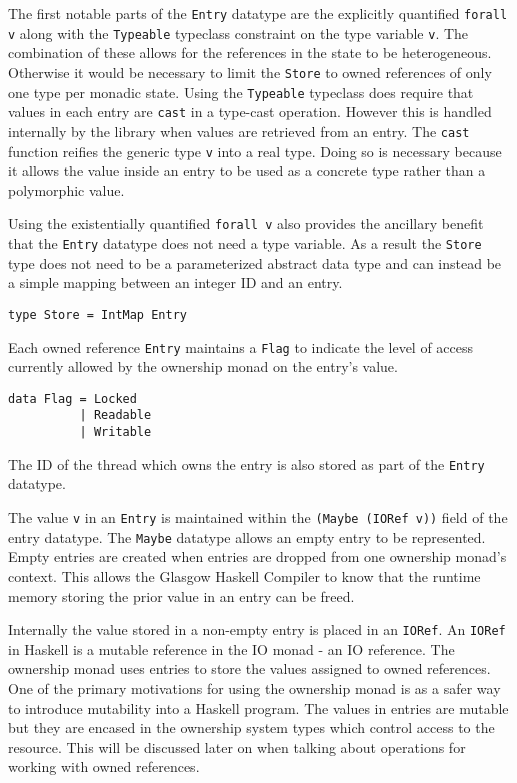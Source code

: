 \documentclass[onehalf,11pt]{beavtex}
\begin{document}
The first notable parts of the \texttt{Entry} datatype are the explicitly
quantified \texttt{forall v} along with the \texttt{Typeable} typeclass
constraint on the type variable \texttt{v}.
The combination of these allows for the references in the state to be
heterogeneous.
Otherwise it would be necessary to limit the \texttt{Store} to owned
references of only one type per monadic state.
Using the \texttt{Typeable} typeclass does require that values in each entry are
\texttt{cast} in a type-cast operation.  However this is handled internally
by the library when values are retrieved from an entry.
The \texttt{cast} function reifies the generic type \texttt{v} into a real
type.
Doing so is necessary because it allows the value inside an entry to be used
as a concrete type rather than a polymorphic value.

Using the existentially quantified \texttt{forall v} also provides the
ancillary benefit that the \texttt{Entry} datatype does not need a type
variable.
As a result the \texttt{Store} type does not need to be a parameterized abstract
data type and can instead be a simple mapping between an integer ID and an entry.

\begin{verbatim}
type Store = IntMap Entry
\end{verbatim}

Each owned reference \texttt{Entry} maintains a \texttt{Flag} to indicate the
level of access currently allowed by the ownership monad on the entry's value.

\begin{verbatim}
data Flag = Locked
          | Readable
          | Writable
\end{verbatim}

The ID of the thread which owns the entry is also stored as part of the
\texttt{Entry} datatype. 

The value \texttt{v} in an \texttt{Entry} is maintained within the
\texttt{(Maybe (IORef v))} field of the entry datatype.
The \texttt{Maybe} datatype allows an empty entry to be represented.
Empty entries are created when entries are dropped from one ownership monad's
context.  This allows the Glasgow Haskell Compiler to know that
the runtime memory storing the prior value in an entry can be freed.

Internally the value stored in a non-empty entry is placed in an \texttt{IORef}.
An \texttt{IORef} in Haskell is a mutable reference in the IO monad - an IO
reference.
The ownership monad uses entries to store the values assigned to owned
references. One of the primary motivations for using the ownership monad
is as a safer way to introduce mutability into a Haskell program.
The values in entries are mutable but they are encased in the ownership system
types which control access to the resource.
This will be discussed later on when talking about operations for working with
owned references.
\end{document}

